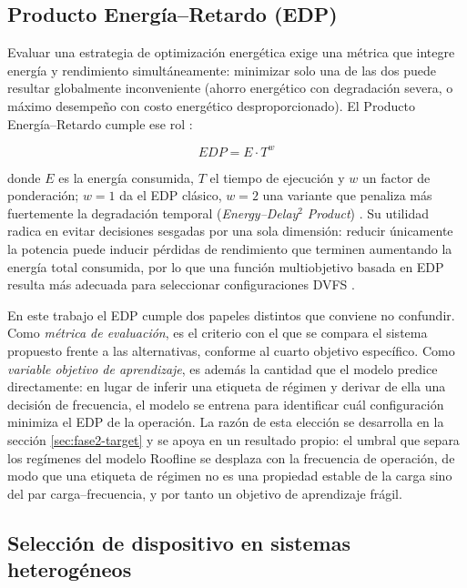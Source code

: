 \documentclass[12pt,oneside,spanish]{book}
\begin{document}
\subsection{Producto Energía--Retardo (EDP)}

Evaluar una estrategia de optimización energética exige una métrica que integre energía y rendimiento simultáneamente: minimizar solo una de las dos puede resultar globalmente inconveniente (ahorro energético con degradación severa, o máximo desempeño con costo energético desproporcionado). El Producto Energía--Retardo cumple ese rol \cite{Laros2013}:

\begin{equation}
EDP = E \cdot T^{w}
\end{equation}

donde $E$ es la energía consumida, $T$ el tiempo de ejecución y $w$ un factor de ponderación; $w=1$ da el EDP clásico, $w=2$ una variante que penaliza más fuertemente la degradación temporal (\textit{Energy--Delay}$^2$ \textit{Product}) \cite{Ali2023,Laros2013}. Su utilidad radica en evitar decisiones sesgadas por una sola dimensión: reducir únicamente la potencia puede inducir pérdidas de rendimiento que terminen aumentando la energía total consumida, por lo que una función multiobjetivo basada en EDP resulta más adecuada para seleccionar configuraciones DVFS \cite{Ali2023}.

En este trabajo el EDP cumple dos papeles distintos que conviene no confundir. Como \textit{métrica de evaluación}, es el criterio con el que se compara el sistema propuesto frente a las alternativas, conforme al cuarto objetivo específico. Como \textit{variable objetivo de aprendizaje}, es además la cantidad que el modelo predice directamente: en lugar de inferir una etiqueta de régimen y derivar de ella una decisión de frecuencia, el modelo se entrena para identificar cuál configuración minimiza el EDP de la operación. La razón de esta elección se desarrolla en la sección \ref{sec:fase2-target} y se apoya en un resultado propio: el umbral que separa los regímenes del modelo Roofline se desplaza con la frecuencia de operación, de modo que una etiqueta de régimen no es una propiedad estable de la carga sino del par carga--frecuencia, y por tanto un objetivo de aprendizaje frágil.

\subsection{Selección de dispositivo en sistemas heterogéneos}
\label{sec:marco-seleccion-dispositivo}
\end{document}
